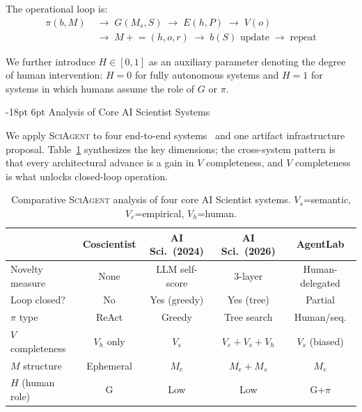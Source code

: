\documentclass[11pt]{article}
\makeatletter
\renewcommand\section{\@startsection{section}{1}{\z@}%
  {-18pt \@plus -4pt \@minus -2pt}%
  {6pt \@plus 2pt}%
  {\normalfont\large\bfseries}}
\newcommand{\framework}{\textsc{SciAgent}}
\makeatother
\begin{document}
\noindent The operational loop is:
\begin{align}
  \pi(b, M) &\;\rightarrow\; G(M_s, S) \;\rightarrow\; E(h, P) \;\rightarrow\; V(o) \nonumber\\
            &\;\rightarrow\; M \mathrel{+}= (h, o, r) \;\rightarrow\; b(S) \text{ update} \;\rightarrow\; \text{repeat}
\end{align}

We further introduce $H \in [0,1]$ as an auxiliary parameter denoting the degree of human intervention: $H=0$ for fully autonomous systems and $H=1$ for systems in which humans assume the role of $G$ or $\pi$.

\section{Analysis of Core AI Scientist Systems}
\label{sec:core}

We apply \framework{} to four end-to-end systems~\citep{boiko2023emergent,lu2024aiscientist,lu2026aiscientist,schmidgall2025agentlab} and one artifact infrastructure proposal. Table~\ref{tab:core-comparison} synthesizes the key dimensions; the cross-system pattern is that every architectural advance is a gain in $V$ completeness, and $V$ completeness is what unlocks closed-loop operation.

\begin{table}[h]
\centering
\small
\setlength{\tabcolsep}{4pt}
\begin{tabular}{@{}lcccc@{}}
\toprule
& \textbf{Coscientist} & \textbf{AI Sci.\ (2024)} & \textbf{AI Sci.\ (2026)} & \textbf{AgentLab} \\
\midrule
Novelty measure   & None         & LLM self-score & 3-layer         & Human-delegated \\
Loop closed?      & No           & Yes (greedy)   & Yes (tree)      & Partial         \\
$\pi$ type        & ReAct        & Greedy         & Tree search     & Human/seq.      \\
$V$ completeness  & $V_h$ only   & $V_s$          & $V_e+V_s+V_h$  & $V_s$ (biased)  \\
$M$ structure     & Ephemeral    & $M_e$          & $M_e+M_s$       & $M_e$           \\
$H$ (human role)  & G            & Low            & Low             & G+$\pi$         \\
\bottomrule
\end{tabular}
\caption{Comparative \framework{} analysis of four core AI Scientist systems. $V_s$=semantic, $V_e$=empirical, $V_h$=human.}
\label{tab:core-comparison}
\end{table}
\end{document}
